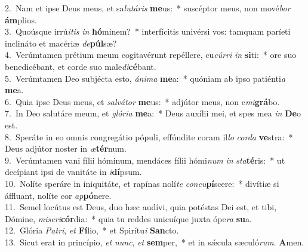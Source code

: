 {2.~}Nam et ipse Deus meus, et sa\textit{lu}\textit{tá}\textit{ris} \textbf{me}us:~* suscéptor meus, non mové\textit{bor} \textbf{ám}plius.\\
{3.~}Quoúsque irrú\textit{i}\textit{tis} \textit{in} \textbf{hó}minem?~* interfícitis univérsi vos: tamquam paríeti inclináto et macériæ \textit{de}\textbf{púl}sæ?\\
{4.~}Verúmtamen prétium meum cogitavérunt repéllere, cu\textit{cúr}\textit{ri} \textit{in} \textbf{si}ti:~* ore suo benedicébant, et corde suo male\textit{di}\textbf{cé}bant.\\
{5.~}Verúmtamen Deo subjécta esto, \textit{á}\textit{ni}\textit{ma} \textbf{me}a:~* quóniam ab ipso patiénti\textit{a} \textbf{me}a.\\
{6.~}Quia ipse Deus meus, et \textit{sal}\textit{vá}\textit{tor} \textbf{me}us:~* adjútor meus, non e\textit{mi}\textbf{grá}bo.\\
{7.~}In Deo salutáre meum, et \textit{gló}\textit{ri}\textit{a} \textbf{me}a:~* Deus auxílii mei, et spes mea \textit{in} \textbf{De}o est.\\
{8.~}Speráte in eo omnis congregátio pópuli, effúndite coram il\textit{lo} \textit{cor}\textit{da} \textbf{ve}stra:~* Deus adjútor noster in \textit{æ}\textbf{tér}num.\\
{9.~}Verúmtamen vani fílii hóminum, mendáces fílii hómi\textit{num} \textit{in} \textit{sta}\textbf{té}ris:~* ut decípiant ipsi de vanitáte in \textit{i}\textbf{dí}psum.\\
{10.~}Nolíte speráre in iniquitáte, et rapínas nolí\textit{te} \textit{con}\textit{cu}\textbf{pí}scere:~* divítiæ si áffluant, nolíte cor \textit{ap}\textbf{pó}nere.\\
{11.~}Semel locútus est Deus, duo hæc audívi, quia potéstas Dei est, et tibi, Dómine, \textit{mi}\textit{se}\textit{ri}\textbf{cór}dia:~* quia tu reddes unicuíque juxta ópe\textit{ra} \textbf{su}a.\\
{12.~}Glória \textit{Pa}\textit{tri}, \textit{et} \textbf{Fí}lio,~* et Spirítu\textit{i} \textbf{San}cto.\\
{13.~}Sicut erat in princípio, \textit{et} \textit{nunc}, \textit{et} \textbf{sem}per,~* et in sǽcula sæculó\textit{rum}. \textbf{A}men.\\
